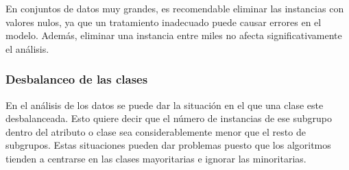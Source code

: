 En conjuntos de datos muy grandes, es recomendable eliminar las instancias con valores nulos, ya que un tratamiento inadecuado puede causar errores en el modelo. Además, eliminar una instancia entre miles no afecta significativamente el análisis.

\subsubsection{Desbalanceo de las clases}

En el análisis de los datos se puede dar la situación en el que una clase este desbalanceada. Esto quiere decir que el número de instancias de ese subgrupo dentro del atributo o clase sea considerablemente menor que el resto de subgrupos. Estas situaciones pueden dar problemas puesto que los algoritmos tienden a centrarse en las clases mayoritarias e ignorar las minoritarias.

